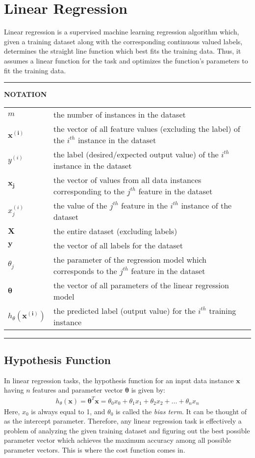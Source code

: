 \documentclass[a4paper, 12pt]{report}
\begin{document}
\chapter{Linear Regression}
Linear regression is a supervised machine learning regression algorithm which, given a training dataset along with the corresponding continuous valued labels, determines the straight line function which best fits the training data. Thus, it assumes a linear function for the task and optimizes the function's parameters to fit the training data.
\vspace{1cm}
\hrule
\begin{center}
\textbf{NOTATION} \\
[8mm]
\begin{tabular}{p{1.8cm}p{9cm}}
$m$ & the number of instances in the dataset\\
[4mm]
$\bm{x^{\left(i\right)}}$ & the vector of all feature values (excluding the label) of the $i^{th}$ instance in the dataset\\
[4mm]
$y^{\left(i\right)}$ & the label (desired/expected output value) of the $i^{th}$ instance in the dataset \\
[4mm]
$\bm{x_j}$ & the vector of values from all data instances corresponding to the $j^{th}$ feature in the dataset\\
[4mm]
$x^{\left(i\right)}_j$ & the value of the $j^{th}$ feature in the $i^{th}$ instance of the dataset \\
[4mm]
$\bm{X}$ & the entire dataset (excluding labels) \\
[4mm]
$\bm{y}$ & the vector of all labels for the dataset \\
[4mm]
${\theta}_j$ & the parameter of the regression model which corresponds to the $j^{th}$ feature in the dataset \\
[4mm]
$\bm{\theta}$ & the vector of all parameters of the linear regression model \\
[4mm]
$h_{\theta}\left(\bm{x^{\left(i\right)}}\right)$ & the predicted label (output value) for the $i^{th}$ training instance
\end{tabular}
\end{center}
\hrule

\section{Hypothesis Function}
In linear regression tasks, the hypothesis function for an input data instance $\bm{x}$ having $n$ features and parameter vector $\bm{\theta}$ is given by:
\begin{align*}
h_{\theta}\left(\bm{x}\right) = \bm{\theta}^T\bm{x} = \theta_0x_0 + \theta_1x_1 + \theta_2x_2 + ... + \theta_nx_n
\end{align*}
Here, $x_0$ is always equal to 1, and $\theta_0$ is called the \textit{bias term}. It can be thought of as the intercept parameter. Therefore, any linear regression task is effectively a problem of analyzing the given training dataset and figuring out the best possible parameter vector which achieves the maximum accuracy among all possible parameter vectors. This is where the cost function comes in.
\end{document}
